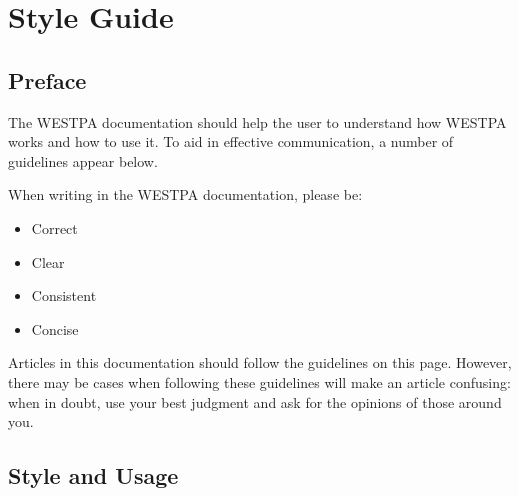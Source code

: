 \documentclass[letterpaper,10pt,english]{sphinxmanual}
\begin{document}
\section{Style Guide}
\label{\detokenize{development/style_guide:style-guide}}\label{\detokenize{development/style_guide::doc}}

\subsection{Preface}
\label{\detokenize{development/style_guide:preface}}
The WESTPA documentation should help the user to understand how WESTPA works
and how to use it. To aid in effective communication, a number of guidelines
appear below.

When writing in the WESTPA documentation, please be:
\begin{itemize}
\item {} 
Correct

\item {} 
Clear

\item {} 
Consistent

\item {} 
Concise

\end{itemize}

Articles in this documentation should follow the guidelines on this page.
However, there may be cases when following these guidelines will make an
article confusing: when in doubt, use your best judgment and ask for the
opinions of those around you.


\subsection{Style and Usage}
\label{\detokenize{development/style_guide:style-and-usage}}
\end{document}
